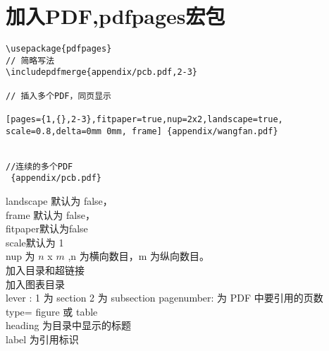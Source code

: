 \section{加入PDF,pdfpages宏包}

\begin{shaded}
\begin{Verbatim}
\usepackage{pdfpages}
// 简略写法
\includepdfmerge{appendix/pcb.pdf,2-3}

// 插入多个PDF，同页显示

[pages={1,{},2-3},fitpaper=true,nup=2x2,landscape=true,
scale=0.8,delta=0mm 0mm, frame] {appendix/wangfan.pdf}


//连续的多个PDF
 {appendix/pcb.pdf}
\end{Verbatim}
\end{shaded}

\noindent
landscape 默认为 false，\\
frame 默认为 false，\\
fitpaper默认为false\\
scale默认为 1\\
nup 为 $n$ x $m$ ,n 为横向数目，m 为纵向数目。\\
加入目录和超链接\\
加入图表目录\\
lever : 1 为 section 2 为 subsection
pagenumber: 为 PDF 中要引用的页数\\
type= figure 或 table\\
heading 为目录中显示的标题\\
label 为引用标识\\
